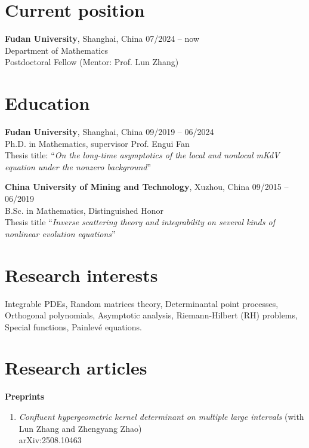 \documentclass[margin]{res}
\begin{document}
\begin{resume}
\section{Current position}
\textbf{Fudan University}, Shanghai, China \hfill 07/2024 -- now\\
Department of Mathematics \\
Postdoctoral Fellow (Mentor: Prof. Lun Zhang)


\section{Education}
\textbf{Fudan University}, Shanghai, China \hfill 09/2019 -- 06/2024\\
Ph.D. in Mathematics, supervisor Prof. Engui Fan \\
Thesis title: ``{\sl On the long-time asymptotics of the local and nonlocal mKdV equation under the nonzero background}''
\par

\textbf{China University of Mining and Technology}, Xuzhou, China \hfill 09/2015 -- 06/2019\\ 
B.Sc. in Mathematics, Distinguished Honor \\
Thesis title ``{\sl Inverse scattering theory and integrability on several kinds of nonlinear evolution equations}''


\section{Research interests}
Integrable PDEs, Random matrices theory, Determinantal point processes, 
Orthogonal polynomials, Asymptotic analysis, Riemann-Hilbert (RH) problems, Special functions, 
Painlev\'e equations.

\section{Research articles}
\textbf{Preprints}
\begin{enumerate}[1.]
    \item {\sl Confluent hypergeometric kernel determinant on multiple large intervals} (with Lun Zhang and Zhengyang Zhao)\\
    arXiv:2508.10463


\end{enumerate}
\end{resume}
\end{document}
